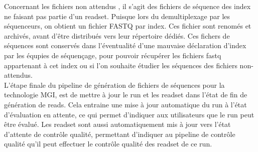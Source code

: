 Concernant les fichiers \og non attendus \fg{}, il s'agit des fichiers de séquence des index ne faisant pas partie d'un readset. Puisque lors du demultiplexage par les séquenceurs, on obtient un fichier FASTQ par index.
Ces fichier sont renomés et archivés, avant d'être distribués vers leur répertoire dédiés.
Ces fichers de séquences sont conservés dans l'éventualité d'une mauvaise déclaration d'index par les équpies de séquençage, pour pouvoir récupérer les fichiers fastq appartenant à cet index ou si l'on souhaite étudier les séquences des fichiers \og non-attendus\fg{}.\\

L'étape finale du pipeline de génération de fichiers de séquences pour la technologie MGI, est de mettre à jour le run et les readset dans l'état de \og fin de génération de reads\fg{}.
Cela entraine une mise à jour automatique du run à l'état \og d'évaluation en attente\fg{}, ce qui permet d'indiquer aux utilisateurs que le run peut être évalué.
Les readset sont aussi automatiquement mis à jour vers l'état \og d'attente de contrôle qualité\fg{}, permettant d'indiquer au pipeline de contrôle qualité qu'il peut effectuer le contrôle qualité des readset de ce run.

